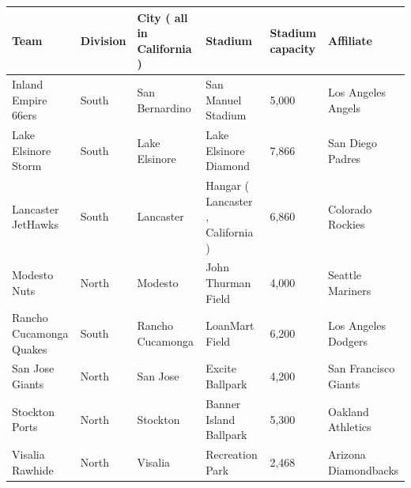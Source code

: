 \documentclass{article}
\begin{document}
\begin{tabular}{llllll}
\toprule
Team & Division & City ( all in California ) & Stadium & Stadium capacity & Affiliate \\
\midrule
Inland Empire 66ers & South & San Bernardino & San Manuel Stadium & 5,000 & Los Angeles Angels \\
Lake Elsinore Storm & South & Lake Elsinore & Lake Elsinore Diamond & 7,866 & San Diego Padres \\
Lancaster JetHawks & South & Lancaster & Hangar ( Lancaster , California ) & 6,860 & Colorado Rockies \\
Modesto Nuts & North & Modesto & John Thurman Field & 4,000 & Seattle Mariners \\
Rancho Cucamonga Quakes & South & Rancho Cucamonga & LoanMart Field & 6,200 & Los Angeles Dodgers \\
San Jose Giants & North & San Jose & Excite Ballpark & 4,200 & San Francisco Giants \\
Stockton Ports & North & Stockton & Banner Island Ballpark & 5,300 & Oakland Athletics \\
Visalia Rawhide & North & Visalia & Recreation Park & 2,468 & Arizona Diamondbacks \\
\bottomrule
\end{tabular}
\end{document}
